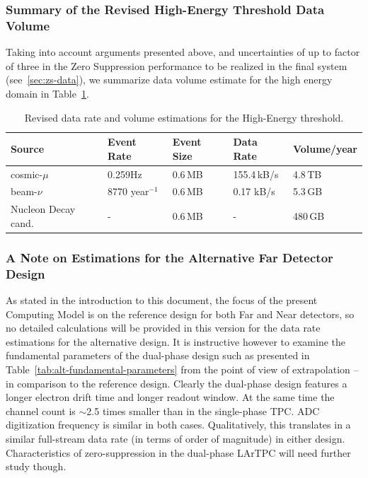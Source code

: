 \subsubsection{Summary of the Revised High-Energy Threshold Data Volume}
\label{sec:fd-data-volume-summary}
Taking into account arguments presented above, and uncertainties of up to factor of three in the Zero Suppression
performance to be realized in the final system (see~\ref{sec:zs-data}), we summarize data volume estimate for
the high energy domain in Table~\ref{tab:fd-data-volume-summary}.
\begin{table}[ht!]
\centering
\begin{tabular}{| p{1.5in} | p{0.95in} | p{0.75in} | p{0.8in} | p{0.9in} |}		\hline	
Source & Event Rate & Event Size & Data Rate & Volume/year \\ \hline
cosmic-$\mu$ & 0.259Hz & 0.6\,MB & 155.4\,kB/s & 4.8\,TB \\ \hline
beam-$\nu$ & 8770 year$^{-1}$ & 0.6\,MB & 0.17 kB/s & 5.3\,GB \\ \hline
Nucleon Decay cand. & - & 0.6\,MB & - & 480\,GB \\ \hline
\end{tabular}
\caption{Revised data rate and volume estimations for the High-Energy threshold.}
\label{tab:fd-data-volume-summary}
\end{table}

\subsubsection{A Note on Estimations for the Alternative Far Detector Design}
As stated in the introduction to this document, the focus of the present Computing Model
is on the reference design for both Far and Near detectors, so no detailed calculations will
be provided in this version for the data rate estimations for the alternative design. It is
instructive however to examine the fundamental parameters of the dual-phase design
such as presented in Table~\ref{tab:alt-fundamental-parameters} from the point of view of
extrapolation -- in comparison to the reference design. Clearly the dual-phase design features
a longer electron drift time and longer readout window. At the same time the channel count
is $\sim$2.5 times smaller than in the single-phase TPC. ADC digitization frequency is similar in both cases.
Qualitatively, this translates in a similar full-stream data rate (in terms of order of magnitude) 
in either design. Characteristics of zero-suppression in the dual-phase LArTPC will need further
study though.

